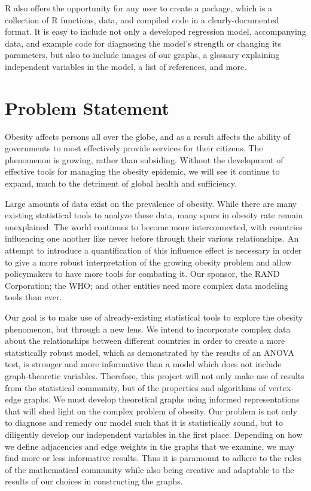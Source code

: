 \documentclass[oneside,12pt]{report}
\begin{document}
R also offers the opportunity for any user to create a package, which is a collection of R functions, data, and compiled code in a clearly-documented format. It is easy to include not only a developed regression model, accompanying data, and example code for diagnosing the model's strength or changing its parameters, but also to include images of our graphs, a glossary explaining independent variables in the model, a list of references, and more.

\chapter{Problem Statement}

Obesity affects persons all over the globe, and as a result affects the ability of governments to most effectively provide services for their citizens. The phenomenon is growing, rather than subsiding. Without the development of effective tools for managing the obesity epidemic, we will see it continue to expand, much to the detriment of global health and sufficiency.

Large amounts of data exist on the prevalence of obesity. While there are many existing statistical tools to analyze these data, many spurs in obesity rate remain unexplained. The world continues to become more interconnected, with countries influencing one another like never before through their various relationships. An attempt to introduce a quantification of this influence effect is necessary in order to give a more robust interpretation of the growing obesity problem and allow policymakers to have more tools for combating it. Our sponsor, the RAND Corporation; the WHO; and other entities need more complex data modeling tools than ever.

Our goal is to make use of already-existing statistical tools to explore the obesity phenomenon, but through a new lens. We intend to incorporate complex data about the relationships between different countries in order to create a more statistically robust model, which as demonstrated by the results of an ANOVA test, is stronger and more informative than a model which does not include graph-theoretic variables. Therefore, this project will not only make use of results from the statistical community, but of the properties and algorithms of vertex-edge graphs. We must develop theoretical graphs using informed representations that will shed light on the complex problem of obesity. Our problem is not only to diagnose and remedy our model such that it is statistically sound, but to diligently develop our independent variables in the first place. Depending on how we define adjacencies and edge weights in the graphs that we examine, we may find more or less informative results. Thus it is paramount to adhere to the rules of the mathematical community while also being creative and adaptable to the results of our choices in constructing the graphs.
\end{document}
